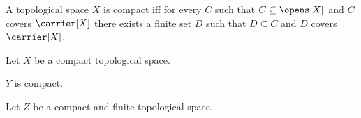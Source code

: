 
\begin{definition}\label{notion_style_compact}
    A topological space $X$ is compact iff for every $C$ such that
        $C\subseteq\opens[X]$ and $C$ covers $\carrier[X]$ there exists
        a finite set $D$ such that $D\subseteq C$ and
        $D$ covers $\carrier[X]$.
\end{definition}

Let $X$ be a compact topological space.

$Y$ is compact.

Let $Z$ be a compact and finite topological space.
